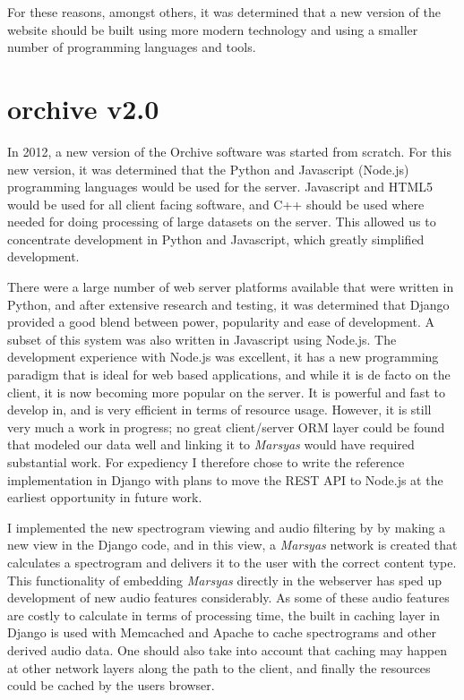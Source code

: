 For these reasons, amongst others, it was determined that a new
version of the website should be built using more modern technology
and using a smaller number of programming languages and tools.

\section{orchive v2.0}
\label{section:softwareAndSystems:orchiveV2}

In 2012, a new version of the Orchive software was started from
scratch.  For this new version, it was determined that the Python and
Javascript (Node.js) programming languages would be used for the
server.  Javascript and HTML5 would be used for all client facing
software, and C++ should be used where needed for doing processing of
large datasets on the server.  This allowed us to concentrate
development in Python and Javascript, which greatly simplified
development.

There were a large number of web server platforms available that were
written in Python, and after extensive research and testing, it was
determined that Django provided a good blend between power, popularity
and ease of development.  A subset of this system was also written in
Javascript using Node.js.  The development experience with Node.js was
excellent, it has a new programming paradigm that is ideal for web
based applications, and while it is de facto on the client, it is now
becoming more popular on the server.  It is powerful and fast to
develop in, and is very efficient in terms of resource usage.
However, it is still very much a work in progress; no great
client/server ORM layer could be found that modeled our data well and
linking it to \textit{Marsyas} would have required substantial work.  For
expediency I therefore chose to write the reference
implementation in Django with plans to move the REST API to Node.js at
the earliest opportunity in future work.

I implemented the new spectrogram viewing and audio filtering by by
making a new view in the Django code, and in this view, a \textit{Marsyas}
network is created that calculates a spectrogram and delivers it to
the user with the correct content type.  This functionality of
embedding \textit{Marsyas} directly in the webserver has sped up development of
new audio features considerably.  As some of these audio features are
costly to calculate in terms of processing time, the built in caching
layer in Django is used with Memcached and Apache to cache
spectrograms and other derived audio data.  One should also take into
account that caching may happen at other network layers along the path
to the client, and finally the resources could be cached by the users
browser.


